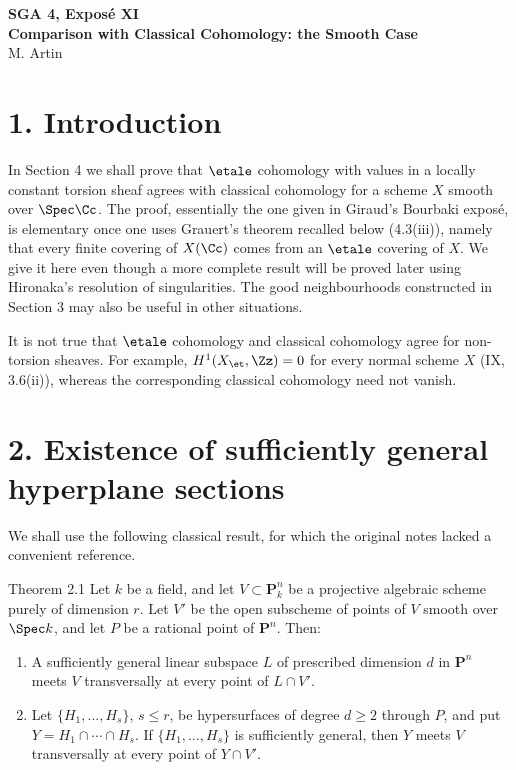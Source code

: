 
\clearpage
\begin{center}
{\Large \textbf{SGA 4, Expos\'e XI}}\\[0.35em]
{\large \textbf{Comparison with Classical Cohomology: the Smooth Case}}\\[0.25em]
{\normalsize M. Artin}
\end{center}

\bigskip

\section*{1. Introduction}
In Section 4 we shall prove that \(\etale\) cohomology with values in a locally constant torsion sheaf agrees with classical cohomology for a scheme \(X\) smooth over \(\Spec\Cc\). The proof, essentially the one given in Giraud's Bourbaki expos\'e, is elementary once one uses Grauert's theorem recalled below (4.3(iii)), namely that every finite covering of \(X(\Cc)\) comes from an \(\etale\) covering of \(X\). We give it here even though a more complete result will be proved later using Hironaka's resolution of singularities. The good neighbourhoods constructed in Section 3 may also be useful in other situations.

It is not true that \(\etale\) cohomology and classical cohomology agree for non-torsion sheaves. For example, \(H^1(X_{\et},\Zz)=0\) for every normal scheme \(X\) (IX, 3.6(ii)), whereas the corresponding classical cohomology need not vanish.

\section*{2. Existence of sufficiently general hyperplane sections}

We shall use the following classical result, for which the original notes lacked a convenient reference.

\begin{statement}{Theorem 2.1}
Let \(k\) be a field, and let \(V\subset \mathbf{P}^n_k\) be a projective algebraic scheme purely of dimension \(r\). Let \(V'\) be the open subscheme of points of \(V\) smooth over \(\Spec k\), and let \(P\) be a rational point of \(\mathbf{P}^n\). Then:
\begin{enumerate}[label=(\roman*)]
\item A sufficiently general linear subspace \(L\) of prescribed dimension \(d\) in \(\mathbf{P}^n\) meets \(V\) transversally at every point of \(L\cap V'\).
\item Let \(\{H_1,\ldots,H_s\}\), \(s\leq r\), be hypersurfaces of degree \(d\geq2\) through \(P\), and put \(Y=H_1\cap\cdots\cap H_s\). If \(\{H_1,\ldots,H_s\}\) is sufficiently general, then \(Y\) meets \(V\) transversally at every point of \(Y\cap V'\).
\end{enumerate}
\end{statement}

